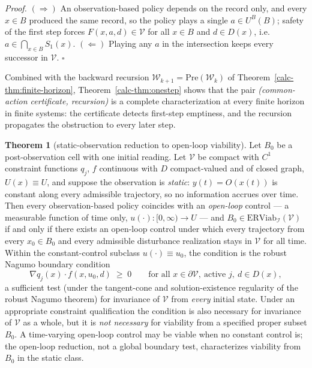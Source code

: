 \documentclass[10pt,twocolumn]{article}
\theoremstyle{definition}
\newtheorem{theorem}{Theorem}
\begin{document}
\emph{Proof.} \((\Rightarrow)\) An observation-based policy depends on the record only, and every \(x \in B\) produced the same record, so the policy plays a single \(a \in U^{B}(B)\); safety of the first step forces \(F(x,a,d) \in \mathcal{V}\) for all \(x \in B\) and \(d \in D(x)\), i.e.\ \(a \in \bigcap_{x \in B} S_{1}(x)\). \((\Leftarrow)\) Playing any \(a\) in the intersection keeps every successor in \(\mathcal{V}\). \hfill\(\square\)

Combined with the backward recursion \(\mathcal{W}_{k+1} = \mathrm{Pre}(\mathcal{W}_{k})\) of Theorem~\ref{calc-thm:finite-horizon}, Theorem~\ref{calc-thm:onestep} shows that the pair \emph{(common-action certificate, recursion)} is a complete characterization at every finite horizon in finite systems: the certificate detects first-step emptiness, and the recursion propagates the obstruction to every later step.

\begin{theorem}[static-observation reduction to open-loop viability]\label{calc-thm:static-complete}
Let \(B_0\) be a post-observation cell with one initial reading. Let \(\mathcal{V}\) be compact with \(C^{1}\) constraint functions \(q_{j}\), \(f\) continuous with \(D\) compact-valued and of closed graph, \(U(x) \equiv U\), and suppose the observation is \emph{static}: \(y(t) = O(x(t))\) is constant along every admissible trajectory, so no information accrues over time. Then every observation-based policy coincides with an \emph{open-loop} control --- a measurable function of time only, \(u(\cdot):[0,\infty)\to U\) --- and \(B_{0} \in \mathrm{ERViab}_{\mathcal{I}}(\mathcal{V})\) if and only if there exists an open-loop control under which every trajectory from every \(x_{0} \in B_{0}\) and every admissible disturbance realization stays in \(\mathcal{V}\) for all time. Within the constant-control subclass \(u(\cdot) \equiv u_{0}\), the condition is the robust Nagumo boundary condition
\[
\nabla q_{j}(x) \cdot f(x, u_{0}, d) \;\ge\; 0
\qquad \text{for all } x \in \partial\mathcal{V},\ \text{active } j,\ d \in D(x),
\]
a sufficient test (under the tangent-cone and solution-existence regularity of the robust Nagumo theorem) for invariance of \(\mathcal V\) from \emph{every} initial state. Under an appropriate constraint qualification the condition is also necessary for invariance of \(\mathcal V\) as a whole, but it is \emph{not necessary} for viability from a specified proper subset \(B_0\). A time-varying open-loop control may be viable when no constant control is; the open-loop reduction, not a global boundary test, characterizes viability from \(B_0\) in the static class.
\end{theorem}
\end{document}
